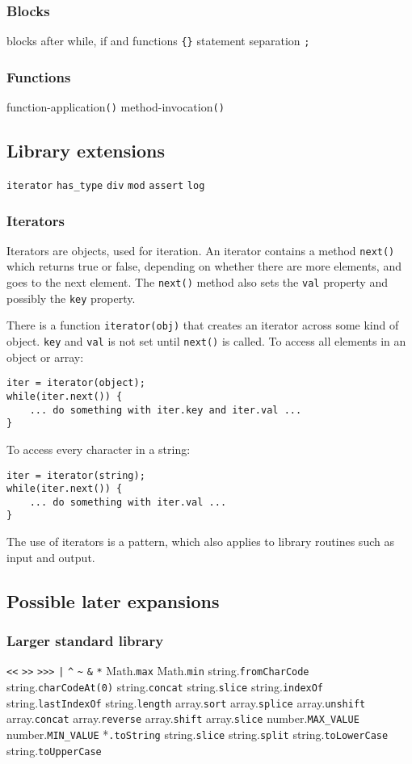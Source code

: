\subsubsection{Blocks}
blocks after while, if and functions \verb|{}|
statement separation \verb|;|

\subsubsection{Functions}
function-application\verb|()|
method-invocation\verb|()|


\subsection{Library extensions}
\verb|iterator|
\verb|has_type|
\verb|div|
\verb|mod|
\verb|assert|
\verb|log|
\subsubsection{Iterators}

Iterators are objects, used for iteration. An iterator contains a method \verb|next()| which returns true or false, depending on whether there are more elements, and goes to the next element. The \verb|next()| method also sets the \verb|val| property and possibly the \verb|key| property.

There is a function \verb|iterator(obj)| that creates an iterator across some kind of object. \verb|key| and \verb|val| is not set until \verb|next()| is called. To access all elements in an object or array:
\begin{verbatim}
iter = iterator(object);
while(iter.next()) {
    ... do something with iter.key and iter.val ...
}
\end{verbatim}
To access every character in a string:
\begin{verbatim}
iter = iterator(string);
while(iter.next()) {
    ... do something with iter.val ...
}
\end{verbatim}

The use of iterators is a pattern, which also applies to library routines such as input and output.



\subsection{Possible later expansions}

\subsubsection{Larger standard library}
\verb|<<|
\verb|>>|
\verb|>>>|
\verb$|$
\verb|^|
\verb|~|
\verb|&|
\verb|*|
Math.\verb|max|
Math.\verb|min|
string.\verb|fromCharCode|
string.\verb|charCodeAt(0)|
string.\verb|concat|
string.\verb|slice|
string.\verb|indexOf|
string.\verb|lastIndexOf|
string.\verb|length|
array.\verb|sort|
array.\verb|splice|
array.\verb|unshift|
array.\verb|concat|
array.\verb|reverse|
array.\verb|shift|
array.\verb|slice|
number.\verb|MAX_VALUE|
number.\verb|MIN_VALUE|
*\verb|.toString|
string.\verb|slice|
string.\verb|split|
string.\verb|toLowerCase|
string.\verb|toUpperCase|




